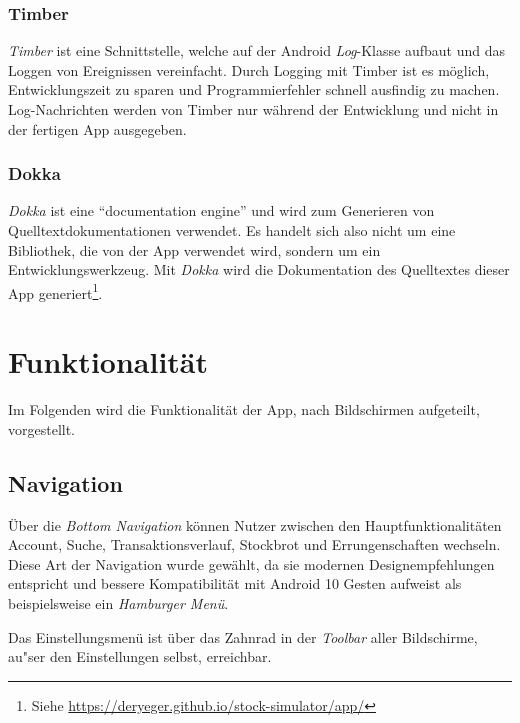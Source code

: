 \documentclass[a4paper]{article}
\begin{document}
\subsubsection{Timber}
\label{subsubsec:technologies:bibs:timber}
\textit{Timber} ist eine Schnittstelle, welche auf der Android \textit{Log}-Klasse aufbaut und das Loggen von Ereignissen vereinfacht.
Durch Logging mit Timber ist es möglich, Entwicklungszeit zu sparen und Programmierfehler schnell ausfindig zu machen.
Log-Nachrichten werden von Timber nur während der Entwicklung und nicht in der fertigen App ausgegeben.


\subsubsection{Dokka}
\label{subsubsec:technologies:bibs:dokka}
\textit{Dokka} ist eine "`documentation engine"' \autocite{dokka} und wird zum Generieren von Quelltextdokumentationen verwendet.
Es handelt sich also nicht um eine Bibliothek, die von der App verwendet wird, sondern um ein Entwicklungswerkzeug.
Mit \textit{Dokka}  wird die Dokumentation des Quelltextes dieser App generiert\footnote{Siehe \url{https://deryeger.github.io/stock-simulator/app/}}.


\section{Funktionalität}
\label{sec:functionality}
Im Folgenden wird die Funktionalität der App, nach Bildschirmen aufgeteilt, vorgestellt.


\subsection{Navigation}
\label{subsec:functionality:navigation}
Über die \textit{Bottom Navigation} können Nutzer zwischen den Hauptfunktionalitäten Account, Suche, Transaktionsverlauf, Stockbrot und Errungenschaften wechseln.
Diese Art der Navigation wurde gewählt, da sie modernen Designempfehlungen \autocite{bottom_navigation} entspricht und bessere Kompatibilität mit Android 10 Gesten aufweist als beispielsweise ein \textit{Hamburger Menü}.

Das Einstellungsmenü ist über das Zahnrad in der \textit{Toolbar} aller Bildschirme, au"ser den Einstellungen selbst, erreichbar.
\end{document}
